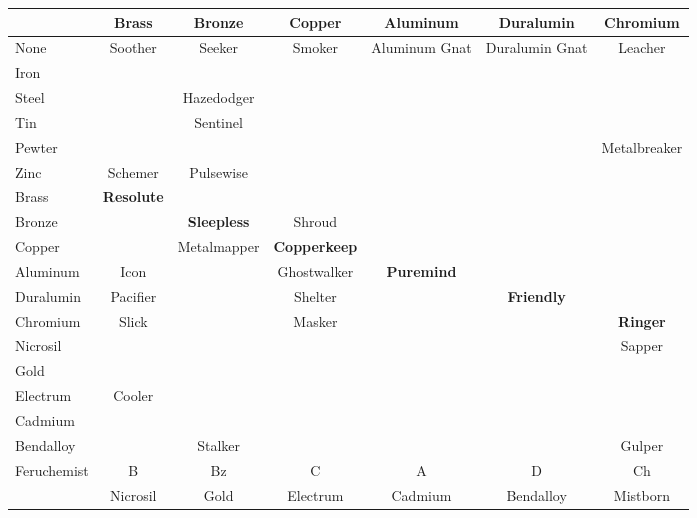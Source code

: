 \documentclass[conference]{IEEEtran}
\begin{document}
\begin{table}[h]
\begin{center}
\begin{tabular}{|l |c |c |c |c |c |c | }
		\cellcolor{black}&Brass&Bronze&Copper&Aluminum&Duralumin&Chromium\\\hline 
		
		\hline
		None	&\cellcolor{darkgreen}\cellcolor{darkgreen}Soother& \cellcolor{darkgreen}Seeker&\cellcolor{darkgreen}Smoker&\cellcolor{darkgreen}Aluminum Gnat&\cellcolor{darkgreen}Duralumin Gnat&\cellcolor{darkgreen}Leacher\\\hline
		
		Iron	& & & & & & \\\hline
		Steel	& &\cellcolor{lightgreen}Hazedodger& & & & \\\hline
		Tin& &\cellcolor{lightgreen}Sentinel& & & & \\\hline
		Pewter& & && & &\cellcolor{lightgreen}Metalbreaker\\\hline
		Zinc&\cellcolor{lightgreen} Schemer&  \cellcolor{lightgreen}Pulsewise&& & &\\\hline
		Brass&\cellcolor{lightred}\textbf{Resolute}& && & &\\\hline
		Bronze& &\cellcolor{lightgreen}\textbf{Sleepless}& \cellcolor{lightgreen}Shroud & & & \\\hline
		Copper& & \cellcolor{lightgreen}Metalmapper& \cellcolor{lightgreen}\textbf{Copperkeep}& & & \\\hline
		Aluminum& \cellcolor{lightgreen}Icon & & \cellcolor{lightgreen}Ghostwalker & \cellcolor{lightgreen}\textbf{Puremind} & &\\\hline
		Duralumin& \cellcolor{lightgreen}Pacifier && \cellcolor{lightgreen}Shelter  &&\cellcolor{lightgreen} \textbf{Friendly}& \\\hline
		Chromium&\cellcolor{lightgreen}Slick&&\cellcolor{lightgreen}Masker&  &  &\cellcolor{lightgreen} \textbf{Ringer}\\\hline
		Nicrosil&&&&  &  & \cellcolor{lightgreen}Sapper \\\hline
		Gold&&&&&&\\\hline
		Electrum&\cellcolor{lightorange}Cooler && &&  &    \\\hline
		Cadmium& & &&  &  &  \\\hline
		Bendalloy&&\cellcolor{lightgreen}Stalker&&&  &\cellcolor{lightgreen}Gulper  \\\hline
		Feruchemist&B&Bz&C& A & D & Ch \\\hline			\hline
		
		\cellcolor{black}&Nicrosil&Gold&Electrum&Cadmium&Bendalloy&Mistborn\\\hline
		

\end{tabular}
\end{center}
\end{table}
\end{document}

